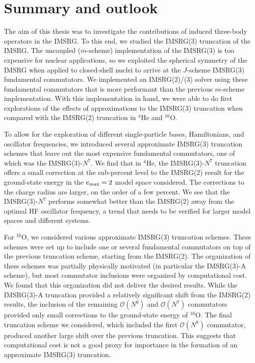 \chapter{Summary and outlook}\label{ch:summary}

The aim of this thesis was to investigate
the contributions of induced three-body operators
in the IMSRG.
To this end,
we studied the IMSRG(3) truncation
of the IMSRG.
The uncoupled ($m$-scheme) implementation of the IMSRG(3)
is too expensive for nuclear applications,
so we exploited the spherical symmetry
of the IMSRG
when applied to closed-shell nuclei
to arrive at the $J$-scheme IMSRG(3)
fundamental commutators.
We implemented an IMSRG(2)/(3) solver
using these fundamental commutators
that is more performant than
the previous $m$-scheme implementation.
With this implementation in hand,
we were able to do first explorations
of the effects of approximations to the IMSRG(3) truncation
when compared with the IMSRG(2) truncation in ${}^{4}\text{He}$
and ${}^{16}\text{O}$.

To allow for the exploration of different single-particle bases,
Hamiltonians, and oscillator frequencies,
we introduced several approximate IMSRG(3) truncation schemes
that leave out the most expensive fundamental commutators,
one of which was the IMSRG(3)-$N^7$.
We find that in ${}^{4}\text{He}$,
the IMSRG(3)-$N^7$ truncation
offers a small correction at the sub-percent level
to the IMSRG(2) result
for the ground-state energy
in the $e_{\text{max}}=2$ model space considered.
The corrections to the charge radius are larger,
on the order of a few percent.
We see that the IMSRG(3)-$N^7$
performs somewhat better than the IMSRG(2)
away from the optimal HF oscillator frequency,
a trend that needs to be verified
for larger model spaces and different systems.

For ${}^{16}\text{O}$,
we considered
various approximate IMSRG(3) truncation schemes.
These schemes were set up to include
one or several fundamental commutators
on top of the previous truncation scheme,
starting from the IMSRG(2).
The organization of these schemes was
partially physically motivated
(in particular the IMSRG(3)-A scheme),
but most commutator inclusions
were organized by computational cost.
We found that this organization
did not deliver the desired results.
While the IMSRG(3)-A truncation
provided a relatively significant shift
from the IMSRG(2) results,
the inclusion of the remaining
$\mathcal{O}(N^6)$ and
$\mathcal{O}(N^7)$ commutators
provided only small corrections
to the ground-state energy of ${}^{16}\text{O}$.
The final truncation scheme we considered,
which included the first $\mathcal{O}(N^8)$
commutator,
produced another large shift over the previous truncation.
This suggests that computational cost
is not a good proxy for importance in the formation of
an approximate IMSRG(3) truncation.

